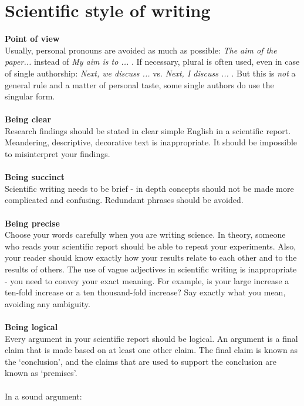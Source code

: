 \documentclass[aodsor,preprint]{imsart}
\numberwithin{equation}{section}
\theoremstyle{plain}
\begin{document}
\section{Scientific style of writing}
\phantom{XXXXXXXXXXXXXXXXXXXXXXXXXXXXXXXXXXXXXXXXXXXXXXXXXXXXXXXXXXXXXXXXXXXXXXXXXXXXXXXXXXXXXXXXXXXXXXXX}

{\bf Point of view}\\
Usually, personal pronouns are avoided as much as possible: \textit{The aim of the paper... } instead of \textit{My aim is to ... }. If necessary, plural is often used, even in case of single authorship: \textit{Next, we discuss ... } vs. \textit{Next, I discuss ... }. But this is \textit{not} a general rule and a matter of personal taste, some single authors do use the singular form.\\
\\
{\bf Being clear}\\
Research findings should be stated in clear simple English in a scientific report. Meandering, descriptive, decorative text is inappropriate. It should be impossible to misinterpret your findings.\\
\\
{\bf Being succinct}\\
Scientific writing needs to be brief - in depth concepts should not be made more complicated and confusing. Redundant phrases should be avoided.\\
\\
{\bf Being precise}\\
Choose your words carefully when you are writing science. In theory, someone who reads your scientific report should be able to repeat your experiments. Also, your reader should know exactly how your results relate to each other and to the results of others. The use of vague adjectives in scientific writing is inappropriate - you need to convey your exact meaning. For example, is your large increase a ten-fold increase or a ten thousand-fold increase? Say exactly what you mean, avoiding any ambiguity.\\
\\
{\bf Being logical}\\
Every argument in your scientific report should be logical. An argument is a final claim that is made based on at least one other claim. The final claim is known as the ‘conclusion’, and the claims that are used to support the conclusion are known as ‘premises’.\\
\\
In a sound argument:
\end{document}
